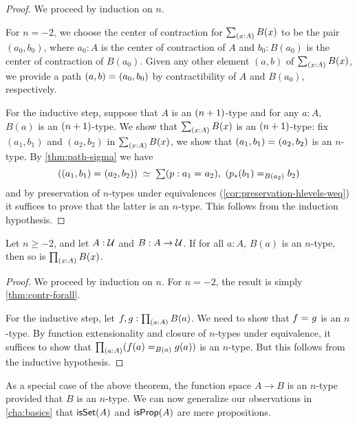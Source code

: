 \begin{proof}
 We proceed by induction on $n$.

 For $n = -2$, we choose the center of contraction for $\sm{x : A} B(x)$ to be the pair
       $(a_0, b_0)$, where $a_0 : A$ is the center of contraction of $A$ and $b_0 : B(a_0)$ is the center of contraction of $B(a_0)$.
       Given any other element $(a,b)$ of $\sm{x : A} B(x)$, we provide a path $(a, b) =_{} (a_0,b_0)$
       by contractibility of $A$ and $B(a_0)$, respectively.

 For the inductive step, suppose that $A$ is an $(n+1)$-type and
         for any $a : A$, $B(a)$ is an $(n+1)$-type. We show that $\sm{x : A} B(x)$ is an $(n+1)$-type:
      fix $(a_1, b_1)$ and $(a_2,b_2)$ in $\sm{x : A} B(x)$,
     we show that $(a_1, b_1) =_{} (a_2,b_2)$ is an $n$-type.
      By \autoref{thm:path-sigma} we have
      \[ \eqvspaced{(\id{(a_1, b_1)}{(a_2,b_2)})}{\sm{p : \id{a_1}{a_2}} (\id[B(a_2)]{\trans{p}{b_1}}{b_2})} \]
   and by preservation of $n$-types under equivalences (\autoref{cor:preservation-hlevels-weq})
   it suffices to prove that the latter is an $n$-type. This follows from the
   induction hypothesis.
\end{proof}


\begin{thm}\label{thm:hlevel-prod}
 Let $n\geq -2$, and let $A : \mathcal{U}$ and $B : A \to \mathcal{U}$.
 If for all $a : A$, $B(a)$ is an $n$-type, then so is $\prd{x : A} B(x)$.
\end{thm}

\begin{proof}
  We proceed by induction on $n$.
  For $n = -2$, the result is simply \autoref{thm:contr-forall}.

  For the inductive step, let $f, g : \prd{a:A}B(a)$.
  We need to show that $f =_{} g$ is an $n$-type.
  By function extensionality and closure of $n$-types under equivalence, it suffices to show that $\prd{a : A} (\id[B(a)]{f(a)}{g(a)})$ is an $n$-type.
  But this follows from the inductive hypothesis.
\end{proof}

As a special case of the above theorem, the function space $A \to B$ is an $n$-type provided that $B$ is an $n$-type.
We can now generalize our observations in \autoref{cha:basics} that $\mathsf{isSet}(A)$ and $\mathsf{isProp}(A)$ are mere propositions.

